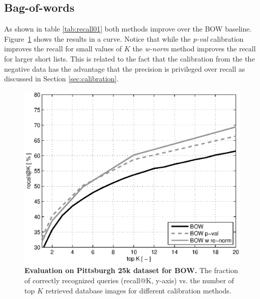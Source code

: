   \subsection{Bag-of-words}
  As shown in table \ref{tab:recall01} both methods improve over the BOW baseline. Figure~\ref{fig:recallBOW} shows the results in a curve. Notice that while the \emph{p-val} calibration improves the recall for small values of $K$ the \emph{w-norm} method improves the recall for larger short lists. This is related to the fact that the calibration from the the negative data has the advantage that the precision is privileged over recall as discussed in Section \ref{sec:calibration}.
  

    \begin{figure}[t!]
        \centering
        \includegraphics[width=1.1\linewidth]{imgs/plotPitt25kBOW}  
        \caption{
            \textbf{Evaluation on Pittsburgh 25k \cite{Gronat13} dataset for BOW.} The fraction of correctly recognized queries (recall@K, y-axis) vs. the number of top $K$ retrieved database images for different calibration methods.
        }
        \label{fig:recallBOW}
    \end{figure}

       
